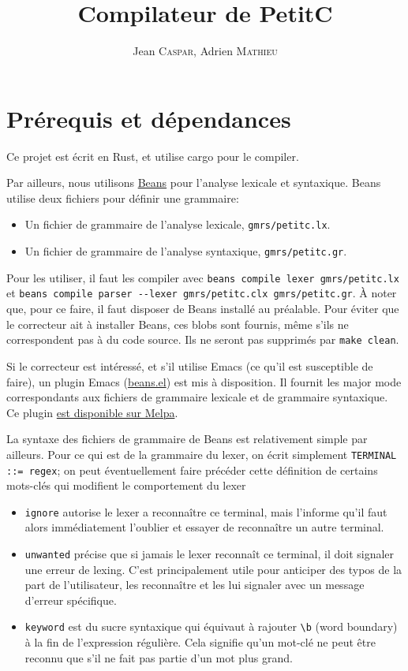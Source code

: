 \documentclass{scrartcl}
\title{Compilateur de PetitC}
\author{%
  Jean \textsc{Caspar},
  Adrien \textsc{Mathieu}
}
\date{}
\begin{document}
\maketitle{}

\section*{Prérequis et dépendances}
Ce projet est écrit en Rust, et utilise cargo pour le compiler.\par
Par ailleurs, nous utilisons \href{https://github.com/jthulhu/beans}{Beans}
pour l'analyse lexicale et syntaxique. Beans utilise deux fichiers pour définir
une grammaire:
\begin{itemize}
  \item Un fichier de grammaire de l'analyse lexicale, \verb|gmrs/petitc.lx|.
  \item Un fichier de grammaire de l'analyse syntaxique, \verb|gmrs/petitc.gr|.
\end{itemize}
Pour les utiliser, il faut les compiler avec \verb|beans compile lexer gmrs/petitc.lx|
et \verb|beans compile parser --lexer gmrs/petitc.clx gmrs/petitc.gr|. À noter
que, pour ce faire, il faut disposer de Beans installé au préalable. Pour éviter
que le correcteur ait à installer Beans, ces blobs sont fournis, même s'ils
ne correspondent pas à du code source. Ils ne seront pas supprimés par
\verb|make clean|.\par
Si le correcteur est intéressé, et s'il utilise Emacs (ce qu'il est susceptible
de faire), un plugin Emacs (\href{https://github.com/jthulhu/emacs-beans}{beans.el})
est mis à disposition. Il fournit les major mode correspondants aux fichiers
de grammaire lexicale et de grammaire syntaxique. Ce plugin
\href{https://melpa.org/#/beans}{est disponible sur Melpa}.\par
La syntaxe des fichiers de grammaire de Beans est relativement simple
par ailleurs. Pour ce qui est de la grammaire du lexer, on écrit
simplement \verb|TERMINAL ::= regex|; on peut éventuellement faire
précéder cette définition de certains mots-clés qui modifient le
comportement du lexer
\begin{itemize}
\item \verb|ignore| autorise le lexer a reconnaître ce terminal, mais
  l'informe qu'il faut alors immédiatement l'oublier et essayer
  de reconnaître un autre terminal.
\item \verb|unwanted| précise que si jamais le lexer reconnaît ce
  terminal, il doit signaler une erreur de lexing. C'est principalement
  utile pour anticiper des typos de la part de l'utilisateur, les
  reconnaître et les lui signaler avec un message d'erreur spécifique.
\item \verb|keyword| est du sucre syntaxique qui équivaut à rajouter
  \verb|\b| (word boundary) à la fin de l'expression régulière. Cela
  signifie qu'un mot-clé ne peut être reconnu que s'il ne fait pas partie
  d'un mot plus grand.
\end{itemize}
\end{document}
